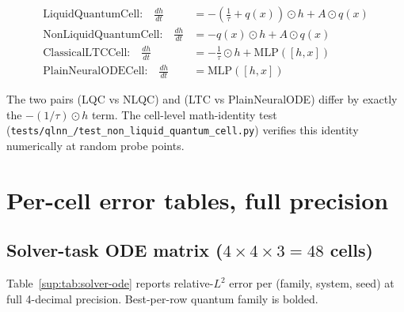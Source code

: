 \documentclass[%
  prx,
  amsmath,
  amssymb,
  aps,
  reprint,
  superscriptaddress,
  floatfix,
]{revtex4-2}
\begin{document}
\begin{align}
\text{LiquidQuantumCell:}\quad
  \frac{dh}{dt} &= -\!\left(\frac{1}{\tau} + q(x)\right) \odot h
                 + A \odot q(x) \\[2pt]
\text{NonLiquidQuantumCell:}\quad
  \frac{dh}{dt} &= -q(x) \odot h + A \odot q(x) \\[2pt]
\text{ClassicalLTCCell:}\quad
  \frac{dh}{dt} &= -\frac{1}{\tau} \odot h
                 + \mathrm{MLP}([h, x]) \\[2pt]
\text{PlainNeuralODECell:}\quad
  \frac{dh}{dt} &= \mathrm{MLP}([h, x])
\end{align}

The two pairs (LQC vs NLQC) and (LTC vs PlainNeuralODE) differ by
exactly the $-(1/\tau) \odot h$ term. The cell-level math-identity
test (\texttt{tests/qlnn\_/test\_non\_liquid\_quantum\_cell.py})
verifies this identity numerically at random probe points.

\section{Per-cell error tables, full precision}
\label{sup:per-cell}

\subsection{Solver-task ODE matrix ($4 \times 4 \times 3 = 48$ cells)}
\label{sup:solver-ode}

Table~\ref{sup:tab:solver-ode} reports relative-$L^2$ error per
(family, system, seed) at full 4-decimal precision. Best-per-row
quantum family is bolded.
\end{document}
